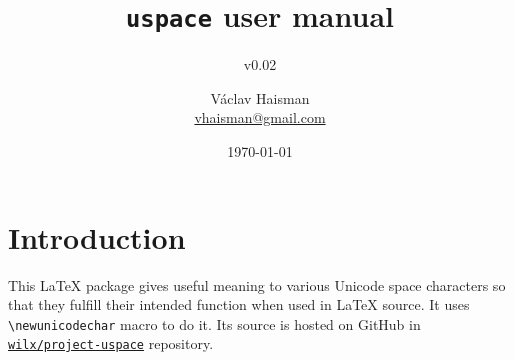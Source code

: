 \documentclass[paper=B5,DIV=calc,parskip=half]{scrartcl}
\author{Václav Haisman\texorpdfstring{%
    \\{\small\href{mailto:vhaisman+uspace@gmail.com?subject=[uspace]}{vhaisman@gmail.com}}}{}}
\date{\today}
\title{\texttt{uspace} user manual}
\subtitle{v0.02}
\begin{document}
\begin{titlepage}
  \maketitle
\end{titlepage}

\tableofcontents

\section{Introduction}%
%
This \LaTeX{} package gives useful meaning to various Unicode space
characters so that they fulfill their intended function when used in \LaTeX{}
source. It uses \lstinline|\newunicodechar| macro to do it. Its source is
hosted on GitHub in
\texttt{\href{https://github.com/wilx/project-uspace}{wilx/project-uspace}}
repository.
\end{document}
